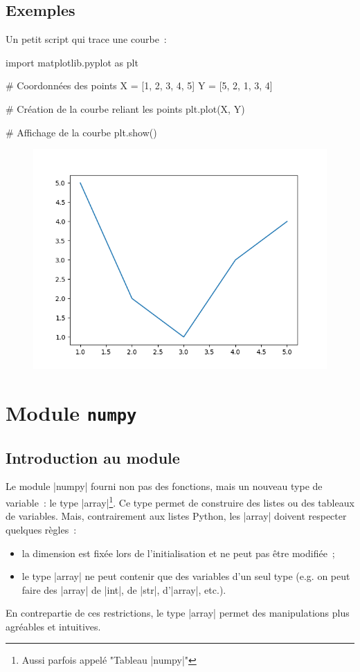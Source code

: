 	\subsection{Exemples}
	
		Un petit script qui trace une courbe~:
		\begin{pythoncode}
			import matplotlib.pyplot as plt
			
			# Coordonnées des points
			X = [1, 2, 3, 4, 5]
			Y = [5, 2, 1, 3, 4]
			
			# Création de la courbe reliant les points
			plt.plot(X, Y)
			
			# Affichage de la courbe
			plt.show()
		\end{pythoncode}
		
		\begin{figure}[htp]
			\centering
			\includegraphics[scale=1.00]{images/Figure_1.png}
		\end{figure}
		
\section{Module \texttt{numpy}} \label{numpy}
	
	\subsection{Introduction au module}
		
		Le module \python|numpy| fourni non pas des fonctions, mais un nouveau type de variable~: le type \python|array|\footnote{Aussi parfois appelé "Tableau \python|numpy|"}.
		Ce type permet de construire des listes ou des tableaux de variables. Mais, contrairement aux listes Python, les \python|array| doivent respecter quelques règles~:
		\begin{itemize}
			\item la dimension est fixée lors de l'initialisation et ne peut pas être modifiée~;
			\item le type \python|array| ne peut contenir que des variables d'un seul type (e.g. on peut faire des \python|array| de \python|int|, de \python|str|, d'\python|array|, etc.).
		\end{itemize}
		En contrepartie de ces restrictions, le type \python|array| permet des manipulations plus agréables et intuitives.
		
